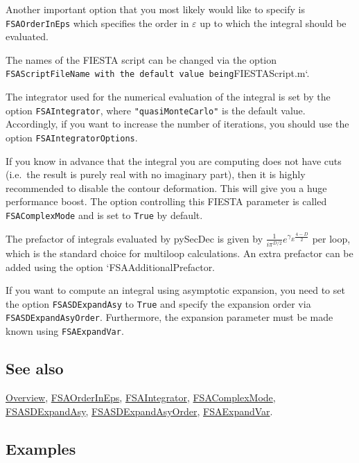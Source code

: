 \documentclass[../FeynHelpersManual.tex]{subfiles}
\begin{document}
Another important option that you most likely would like to specify is
\texttt{FSAOrderInEps} which specifies the order in \(\varepsilon\) up
to which the integral should be evaluated.

The names of the FIESTA script can be changed via the option
\texttt{FSAScriptFileName with the default value being}FIESTAScript.m`.

The integrator used for the numerical evaluation of the integral is set
by the option \texttt{FSAIntegrator}, where \texttt{"quasiMonteCarlo"}
is the default value. Accordingly, if you want to increase the number of
iterations, you should use the option \texttt{FSAIntegratorOptions}.

If you know in advance that the integral you are computing does not have
cuts (i.e.~the result is purely real with no imaginary part), then it is
highly recommended to disable the contour deformation. This will give
you a huge performance boost. The option controlling this FIESTA
parameter is called \texttt{FSAComplexMode} and is set to \texttt{True}
by default.

The prefactor of integrals evaluated by pySecDec is given by
\(\frac{1}{i \pi^{D/2}} e^{\gamma_E \frac{4-D}{2}}\) per loop, which is
the standard choice for multiloop calculations. An extra prefactor can
be added using the option `FSAAdditionalPrefactor.

If you want to compute an integral using asymptotic expansion, you need
to set the option \texttt{FSASDExpandAsy} to \texttt{True} and specify
the expansion order via \texttt{FSASDExpandAsyOrder}. Furthermore, the
expansion parameter must be made known using \texttt{FSAExpandVar}.

\subsection{See also}

\hyperlink{toc}{Overview}, \hyperlink{fsaorderineps}{FSAOrderInEps},
\hyperlink{fsaintegrator}{FSAIntegrator},
\hyperlink{fsacomplexmode}{FSAComplexMode},
\hyperlink{fsasdexpandasy}{FSASDExpandAsy},
\hyperlink{fsasdexpandasyorder}{FSASDExpandAsyOrder},
\hyperlink{fsaexpandvar}{FSAExpandVar}.

\subsection{Examples}
\end{document}

